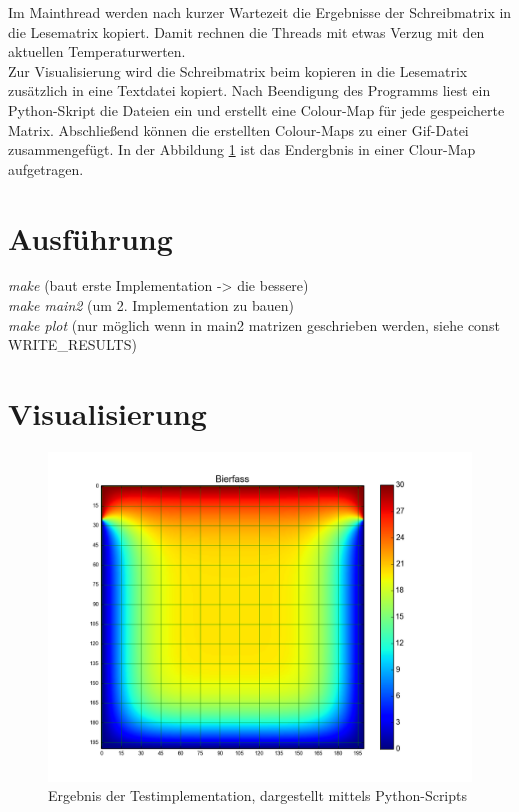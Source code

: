 \documentclass[]{article}
\begin{document}
Im Mainthread werden nach kurzer Wartezeit die Ergebnisse der Schreibmatrix in die Lesematrix kopiert. Damit rechnen die Threads mit etwas Verzug mit den aktuellen Temperaturwerten. \\
Zur Visualisierung wird die Schreibmatrix beim kopieren in die Lesematrix zusätzlich in eine Textdatei kopiert. Nach Beendigung des Programms liest ein Python-Skript die Dateien ein und erstellt eine Colour-Map für jede gespeicherte Matrix. Abschließend können die erstellten Colour-Maps zu einer Gif-Datei zusammengefügt. In der Abbildung \ref{pic:ergebnis} ist das Endergbnis in einer Clour-Map aufgetragen. 


\section*{Ausführung}
\textit{make} (baut erste Implementation -> die bessere) \\
\textit{make main2} (um 2. Implementation zu bauen) \\
\textit{make plot} (nur möglich wenn in main2 matrizen geschrieben werden, siehe const WRITE\_RESULTS)

\newpage
\section*{Visualisierung}
\begin{figure}[h]
	\centering 
	\includegraphics[width=1\linewidth]{ergebnis.png}
	\caption{Ergebnis der Testimplementation, dargestellt mittels Python-Scripts}
	\label{pic:ergebnis}
\end{figure}
\end{document}
